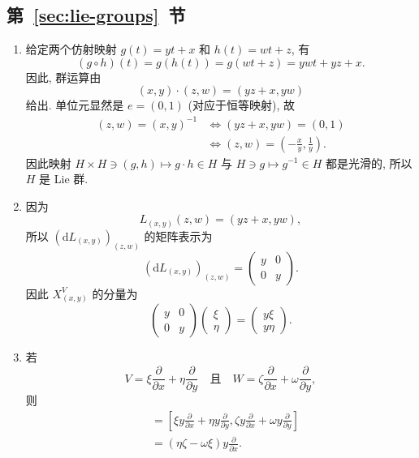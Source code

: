 \subsection{\texorpdfstring{第~\ref{sec:lie-groups}~节}{Lie 群}}\label{subsec:solutions-lie-groups}

\begin{description}[font=\normalfont,leftmargin=2em,labelwidth=1.5em]
\begin{enumerate}[label=(\alph*),ref=\alph*,leftmargin=*]
\item 给定两个仿射映射 $g(t)=yt+x$ 和 $h(t)=wt+z$, 有
\[
  (g\circ h)(t)=g(h(t))=g(wt+z)=ywt+yz+x.
\]
因此, 群运算由
\[
  (x,y)\cdot(z,w)=(yz+x,yw)
\]
给出. 单位元显然是 $e=(0,1)$ (对应于恒等映射), 故
\begin{align*}
  (z,w)=(x,y)^{-1}&\iff(yz+x,yw)=(0,1)\\
  &\iff(z,w)=\left(-\frac{x}{y},\frac1y\right).
\end{align*}
因此映射 $H\times H\ni(g,h)\mapsto g\cdot h\in H$ 与 $H\ni g\mapsto g^{-1}\in H$ 都是光滑的, 所以 $H$ 是 Lie 群.
\item 因为
\[
  L_{(x,y)}(z,w)=(yz+x,yw),
\]
所以 $(\mathrm{d}L_{(x,y)})_{(z,w)}$ 的矩阵表示为
\[
  (\mathrm{d}L_{(x,y)})_{(z,w)}=\begin{pmatrix}y&0\\0&y\end{pmatrix}.
\]
因此 $X^V_{(x,y)}$ 的分量为
\[
  \begin{pmatrix}y&0\\0&y\end{pmatrix}\begin{pmatrix}\xi\\\eta\end{pmatrix}
  =\begin{pmatrix}y\xi\\y\eta\end{pmatrix}.
\]
\item\label{sol:affine-group-bracket} 若
\[
  V=\xi\frac{\partial}{\partial x}+\eta\frac{\partial}{\partial y}
  \quad\text{且}\quad
  W=\zeta\frac{\partial}{\partial x}+\omega\frac{\partial}{\partial y},
\]
则
\begin{align*}
  [X^V,X^W]
  &=\left[\xi y\frac{\partial}{\partial x}+\eta y\frac{\partial}{\partial y},
    \zeta y\frac{\partial}{\partial x}+\omega y\frac{\partial}{\partial y}\right]\\
  &=(\eta\zeta-\omega\xi)y\frac{\partial}{\partial x}.
\end{align*}

\end{enumerate}
\end{description}
